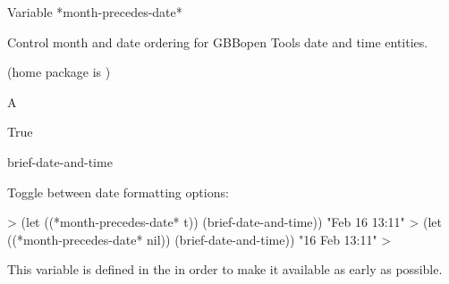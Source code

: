 \documentclass[10pt,twoside,english,pdftex]{article}
\begin{document}
\W\entities
\T\clearpage


\begin{functiondoc}{Variable}%
{*month-precedes-date*}{}%

\fnsyntax

\fnpurpose Control month and date ordering for GBBopen Tools date and time
entities.

\fnpackage {} (home package is )

\fnmodule {}

\fnvaluetype A 

\fninitialvalue True

\begin{alsos}{brief-date-and-time}
\end{alsos}

\fnexamples
Toggle between date formatting options:
%
\W\supp
\begin{example}
  > (let ((*month-precedes-date* t))
      (brief-date-and-time))
  "Feb 16 13:11"
  > (let ((*month-precedes-date* nil))
      (brief-date-and-time))
  "16 Feb 13:11"
  >
\end{example}

\fnnote
{}%
%
%
This variable is defined in the  
in order to make it available as early as possible.

\end{functiondoc}

\end{document}
